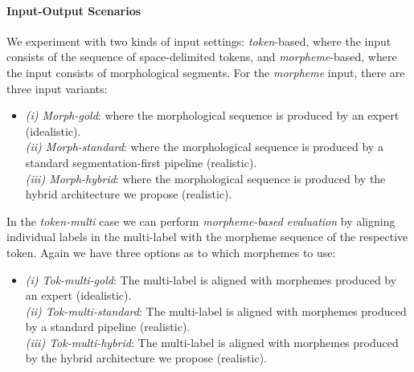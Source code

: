 \documentclass[11pt,a4paper]{article}
\newcommand{\MULMACRO}{{\em token-multi}\xspace}
\newcommand{\MORMACRO}{{\em morpheme}\xspace}
\begin{document}
\paragraph{Input-Output Scenarios}
We experiment with two kinds of input settings:
{\em token}-based, where the input consists of the sequence of space-delimited tokens, and \MORMACRO-based, where the input consists of  morphological segments. For the \MORMACRO input, there are three input variants:
    \begin{itemize}
    \item[] 
     {\em (i) Morph-gold}:  where the  morphological sequence is produced by an expert (idealistic). 
     \\ {\em (ii) Morph-standard}:  where the  morphological sequence is produced by a standard segmentation-first pipeline (realistic).
    \\ {\em (iii) Morph-hybrid}:  where the  morphological sequence is produced by the hybrid architecture we propose (realistic).
   \end{itemize}
     
In the \MULMACRO case we can perform {\em morpheme-based evaluation} by aligning individual labels in the multi-label with the morpheme sequence of the respective token.  Again we have three options as to which morphemes to use:
 
     \begin{itemize}
      \item[] {\em (i) Tok-multi-gold}:   The multi-label is aligned with morphemes produced by an expert (idealistic). 
    \\ {\em (ii) Tok-multi-standard}:   The  multi-label is aligned with morphemes produced by a standard pipeline (realistic).
  \\ {\em (iii) Tok-multi-hybrid}:   The multi-label  is aligned with morphemes produced by the hybrid architecture we propose (realistic).
\end{itemize} 
\end{document}
